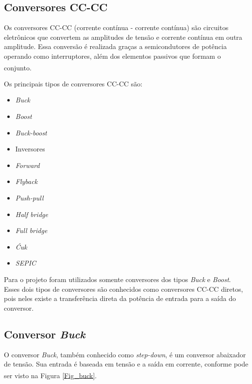 \documentclass[
	12pt,				%
	openright,			%
	oneside,			%
	a4paper,			%
	english,			%
	french,				%
	spanish,			%
	brazil,				%
	oldfontcommands
	]{abntex2}
\begin{document}
\subsection[Conversores CC-CC]{Conversores CC-CC}

	Os conversores CC-CC (corrente contínua - corrente contínua) são circuitos eletrônicos que convertem as amplitudes de tensão e corrente contínua em outra amplitude. Essa conversão é realizada graças a semicondutores de potência operando como interruptores, além dos elementos passivos que formam o conjunto.\textsuperscript{\cite{semicondutores3}}
	
	Os principais tipos de conversores CC-CC são:
	
	\begin{minipage}{7cm}
		\begin{itemize}
			\item	\textit{Buck}
			\item	\textit{Boost}
			\item	\textit{Buck-boost}
			\item	Inversores
			\item	\textit{Forward}
			\item	\textit{Flyback}
	\end{itemize}
	\end{minipage}
	\begin{minipage}{7cm}
		\begin{itemize}
			\item	\textit{Push-pull}
			\item	\textit{Half bridge}
			\item	\textit{Full bridge}
			\item	\textit{Ćuk}
			\item	\textit{SEPIC}
		\end{itemize}
	\end{minipage}

	Para o projeto foram utilizados somente conversores dos tipos \textit{Buck} e \textit{Boost}. Esses dois tipos de conversores são conhecidos como conversores CC-CC diretos, pois neles existe a transferência direta da potência de entrada para a saída do conversor.
	
\subsection[Conversor Buck]{Conversor \textit{Buck}}

	O conversor \textit{Buck}, também conhecido como \textit{step-down}, é um conversor abaixador de tensão. Sua entrada é baseada em tensão e a saída em corrente, conforme pode ser visto na Figura \ref{Fig_buck}.\textsuperscript{\cite{inep}}
	
\end{document}
